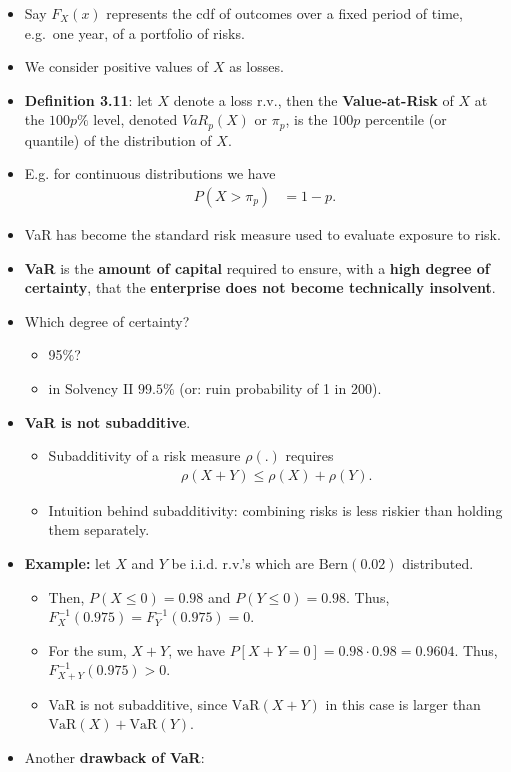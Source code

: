 \documentclass[]{book}
\theoremstyle{definition}
\theoremstyle{definition}
\theoremstyle{definition}
\theoremstyle{remark}
\begin{document}
\begin{itemize}
\item
  Say \(F_X(x)\) represents the cdf of outcomes over a fixed period of
  time, e.g.~one year, of a portfolio of risks.
\item
  We consider positive values of \(X\) as losses.
\item
  \textbf{Definition 3.11}: let \(X\) denote a loss r.v., then the
  \textbf{Value-at-Risk} of \(X\) at the \(100p\%\) level, denoted
  \(VaR_p(X)\) or \(\pi_p\), is the \(100p\) percentile (or quantile) of
  the distribution of \(X\).
\item
  E.g. for continuous distributions we have \[\begin{aligned}
  P(X> \pi_p) &= 1-p.\end{aligned}\]
\item
  VaR has become the standard risk measure used to evaluate exposure to
  risk.
\item
  \textbf{VaR} is the \textbf{amount of capital} required to ensure,
  with a \textbf{high degree of certainty}, that the \textbf{enterprise
  does not become technically insolvent}.
\item
  Which degree of certainty?

  \begin{itemize}
  \item
    95\(\%\)?
  \item
    in Solvency II \(99.5\%\) (or: ruin probability of 1 in 200).
  \end{itemize}
\item
  \textbf{VaR is not subadditive}.

  \begin{itemize}
  \item
    Subadditivity of a risk measure \(\rho(.)\) requires
    \[\begin{aligned}
    \rho(X+Y) \leq \rho(X)+\rho(Y).\end{aligned}\]
  \item
    Intuition behind subadditivity: combining risks is less riskier than
    holding them separately.
  \end{itemize}
\item
  \textbf{Example:} let \(X\) and \(Y\) be i.i.d. r.v.'s which are
  \(\text{Bern}(0.02)\) distributed.

  \begin{itemize}
  \item
    Then, \(P(X\leq 0) = 0.98\) and \(P(Y\leq 0)=0.98\). Thus,
    \(F_X^{-1}(0.975)=F_Y^{-1}(0.975)=0\).
  \item
    For the sum, \(X+Y\), we have \(P[X+Y=0]=0.98 \cdot 0.98=0.9604\).
    Thus, \(F_{X+Y}^{-1}(0.975)>0\).
  \item
    VaR is not subadditive, since \(\text{VaR}(X+Y)\) in this case is
    larger than \(\text{VaR}(X)+\text{VaR}(Y)\).
  \end{itemize}
\item
  Another \textbf{drawback of VaR}:


\end{itemize}
\end{document}
